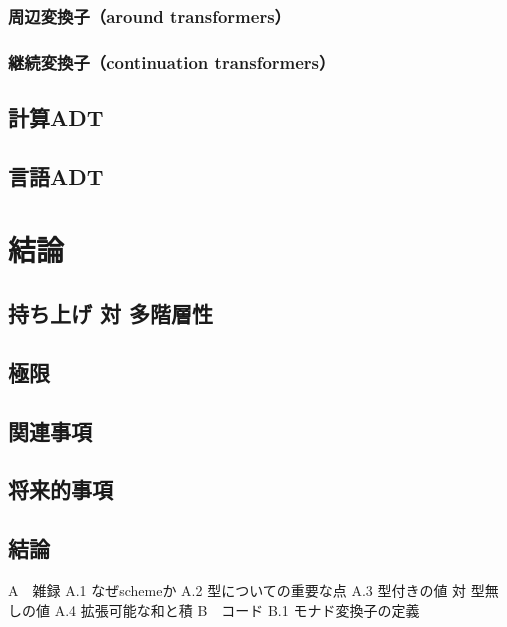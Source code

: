 \documentclass[11pt, oneside]{jsarticle}   	%
\begin{document}
\subsubsection{ 周辺変換子（around transformers） }
\subsubsection{ 継続変換子（continuation transformers） }
\subsection{ 計算ADT }
\subsection{ 言語ADT }
\section{ 結論 }
\subsection{ 持ち上げ 対 多階層性 }
\subsection{ 極限 }
\subsection{ 関連事項 }
\subsection{ 将来的事項 }
\subsection{ 結論 }
A　雑録
    A.1    なぜschemeか
    A.2    型についての重要な点
    A.3    型付きの値 対 型無しの値
    A.4    拡張可能な和と積
B　コード
    B.1    モナド変換子の定義
\end{document}
